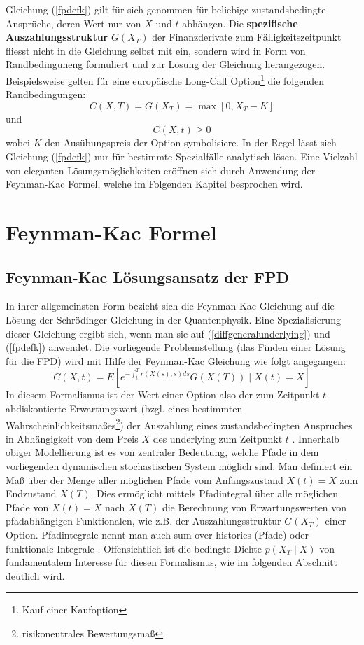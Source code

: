 \documentclass[12pt,a4paper,headsepline,bibliography=totoc,listof=totoc,headinclude=false,footinclude=false,BCOR5mm]{scrreprt} %
\begin{document}
Gleichung (\ref{fpdefk}) gilt f\"ur sich genommen f\"ur beliebige zustandsbedingte Anspr\"uche, deren Wert nur von $X$ und $t$ abh\"angen. Die {\bf spezifische Auszahlungsstruktur} $G(X_{T})$ der Finanzderivate zum F\"alligkeitszeitpunkt fliesst nicht in die Gleichung selbst mit ein, sondern wird in Form von Randbedinguneng formuliert und zur L\"osung der Gleichung herangezogen. Beispielsweise gelten f\"ur eine europ\"aische Long-Call Option\footnote{Kauf einer Kaufoption}  die folgenden Randbedingungen: 
\begin{equation}\label{longcall}
C(X,T) = G(X_{T}) = \max[0,X_{T}-K]
\end{equation}
und 
\begin{equation} 
C(X,t) \geq  0
\end{equation}
wobei $K$ den Aus\"ubungspreis der Option symbolisiere.
In der Regel l\"asst sich Gleichung (\ref{fpdefk}) nur f\"ur bestimmte Spezialf\"alle analytisch l\"osen. Eine Vielzahl von eleganten L\"osungsm\"oglichkeiten er\"offnen sich durch Anwendung der Feynman-Kac Formel, welche im Folgenden Kapitel besprochen wird.

\chapter{Feynman-Kac Formel}\label{FK}
\section{Feynman-Kac L\"osungsansatz der FPD}
In ihrer allgemeinsten Form bezieht sich die Feynman-Kac Gleichung \cite{Feynman1948,Kac1949} auf die L\"osung der Schr\"odinger-Gleichung in der Quantenphysik. Eine Spezialisierung dieser Gleichung ergibt sich, wenn man sie auf (\ref{diffgeneralunderlying}) und (\ref{fpdefk}) anwendet. Die vorliegende Problemstellung (das Finden einer L\"osung f\"ur die FPD) wird mit Hilfe der Feynman-Kac Gleichung  wie folgt angegangen:
\begin{equation} \label{feynman}
C(X,t) = E \left [e^{- \int_{t}^{T}  r(X(s),s)ds} G(X(T)) \mid X(t) = X \right ] 
\end{equation}  In diesem Formalismus ist der Wert einer Option also der zum Zeitpunkt $t$ abdiskontierte Erwartungswert (bzgl. eines bestimmten Wahrscheinlichkeitsma{\ss}es\footnote{risikoneutrales Bewertungsma{\ss}}) der Auszahlung eines zustandsbedingten Anspruches in Abh\"angigkeit von dem Preis $X$ des underlying zum Zeitpunkt $t$ \cite{Brandimarte2006}. 
Innerhalb obiger Modellierung ist es von zentraler Bedeutung, welche Pfade in dem vorliegenden dynamischen stochastischen System m\"oglich sind. Man definiert ein Ma{\ss} \"uber der Menge aller m\"oglichen Pfade vom Anfangszustand $X(t)=X$ zum Endzustand $X(T)$. Dies erm\"oglicht mittels Pfad\-integral \"uber alle m\"oglichen Pfade von $X(t)=X$ nach $X(T)$ die Berechnung von Erwartungswerten von pfadabh\"angigen Funktionalen, wie z.B. der Auszahlungsstruktur $G(X_{T})$ einer Option. Pfadintegrale nennt man auch sum-over-histories (Pfade) oder  funktionale Integrale \cite[S. 129ff.]{Linetsky1998}. Offensichtlich ist die bedingte Dichte $p(X_T\mid X)$  von fundamentalem Interesse f\"ur diesen Formalismus, wie im folgenden Abschnitt deutlich wird. 
\end{document}
